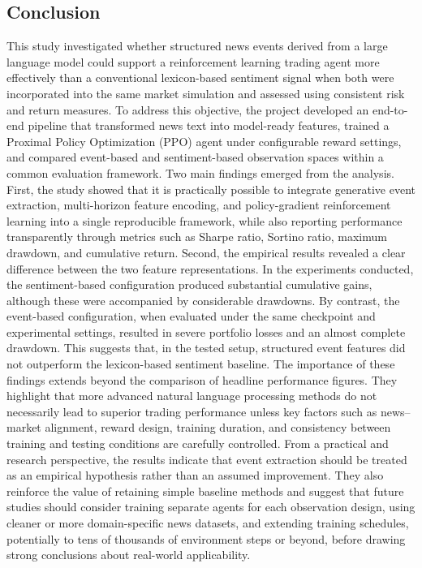 \documentclass[a4paper,fleqn]{cas-sc}
\begin{document}
\subsection{Conclusion}\label{sec:Conclusion}
This study investigated whether structured news events derived from a large language model could support a reinforcement learning trading agent more effectively than a conventional lexicon-based sentiment signal when both were incorporated into the same market simulation and assessed using consistent risk and return measures. To address this objective, the project developed an end-to-end pipeline that transformed news text into model-ready features, trained a Proximal Policy Optimization (PPO) agent under configurable reward settings, and compared event-based and sentiment-based observation spaces within a common evaluation framework.
Two main findings emerged from the analysis. First, the study showed that it is practically possible to integrate generative event extraction, multi-horizon feature encoding, and policy-gradient reinforcement learning into a single reproducible framework, while also reporting performance transparently through metrics such as Sharpe ratio, Sortino ratio, maximum drawdown, and cumulative return. Second, the empirical results revealed a clear difference between the two feature representations. In the experiments conducted, the sentiment-based configuration produced substantial cumulative gains, although these were accompanied by considerable drawdowns. By contrast, the event-based configuration, when evaluated under the same checkpoint and experimental settings, resulted in severe portfolio losses and an almost complete drawdown. This suggests that, in the tested setup, structured event features did not outperform the lexicon-based sentiment baseline.
The importance of these findings extends beyond the comparison of headline performance figures. They highlight that more advanced natural language processing methods do not necessarily lead to superior trading performance unless key factors such as news–market alignment, reward design, training duration, and consistency between training and testing conditions are carefully controlled. From a practical and research perspective, the results indicate that event extraction should be treated as an empirical hypothesis rather than an assumed improvement. They also reinforce the value of retaining simple baseline methods and suggest that future studies should consider training separate agents for each observation design, using cleaner or more domain-specific news datasets, and extending training schedules, potentially to tens of thousands of environment steps or beyond, before drawing strong conclusions about real-world applicability.
\end{document}
